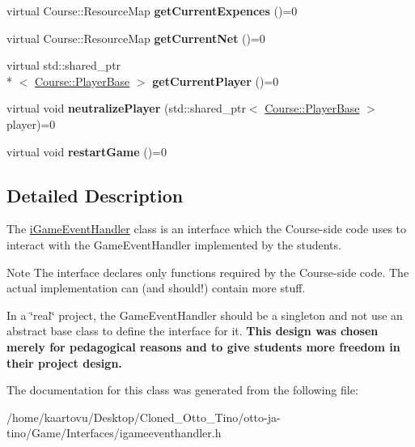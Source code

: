 \begin{DoxyCompactItemize}
\item 
\hypertarget{class_course_1_1i_game_event_handler_a59e601715dde93390fb167f2929c0eb8}{virtual Course\-::\-Resource\-Map {\bfseries get\-Current\-Expences} ()=0}\label{class_course_1_1i_game_event_handler_a59e601715dde93390fb167f2929c0eb8}

\item 
\hypertarget{class_course_1_1i_game_event_handler_a2edfe04f9d882dd69fdfa79fbd618ba7}{virtual Course\-::\-Resource\-Map {\bfseries get\-Current\-Net} ()=0}\label{class_course_1_1i_game_event_handler_a2edfe04f9d882dd69fdfa79fbd618ba7}

\item 
\hypertarget{class_course_1_1i_game_event_handler_a5cd1f40527ea6143ca51addae05b02a5}{virtual std\-::shared\-\_\-ptr\\*
$<$ \hyperlink{class_course_1_1_player_base}{Course\-::\-Player\-Base} $>$ {\bfseries get\-Current\-Player} ()=0}\label{class_course_1_1i_game_event_handler_a5cd1f40527ea6143ca51addae05b02a5}

\item 
\hypertarget{class_course_1_1i_game_event_handler_a0aacafb21d5327f1cdd4df98012c9d0a}{virtual void {\bfseries neutralize\-Player} (std\-::shared\-\_\-ptr$<$ \hyperlink{class_course_1_1_player_base}{Course\-::\-Player\-Base} $>$ player)=0}\label{class_course_1_1i_game_event_handler_a0aacafb21d5327f1cdd4df98012c9d0a}

\item 
\hypertarget{class_course_1_1i_game_event_handler_ab5d7bb2b679c7f8bd280b892b5c983e0}{virtual void {\bfseries restart\-Game} ()=0}\label{class_course_1_1i_game_event_handler_ab5d7bb2b679c7f8bd280b892b5c983e0}

\end{DoxyCompactItemize}


\subsection{Detailed Description}
The \hyperlink{class_course_1_1i_game_event_handler}{i\-Game\-Event\-Handler} class is an interface which the Course-\/side code uses to interact with the Game\-Event\-Handler implemented by the students. 

\begin{DoxyNote}{Note}
The interface declares only functions required by the Course-\/side code. The actual implementation can (and should!) contain more stuff. 

In a \char`\"{}real\char`\"{} project, the Game\-Event\-Handler should be a singleton and not use an abstract base class to define the interface for it. {\bfseries This design was chosen merely for pedagogical reasons and to give students more freedom in their project design.} 
\end{DoxyNote}


The documentation for this class was generated from the following file\-:\begin{DoxyCompactItemize}
\item 
/home/kaartovu/\-Desktop/\-Cloned\-\_\-\-Otto\-\_\-\-Tino/otto-\/ja-\/tino/\-Game/\-Interfaces/igameeventhandler.\-h\end{DoxyCompactItemize}
